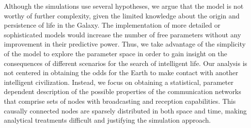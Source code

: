 \documentclass[crop]{CSLB}
\begin{document}
Although the simulations use several hypotheses, we
argue that the model is not worthy of further complexity,
given the limited knowledge about the origin and persistence of
life in the Galaxy.
%
The implementation of more detailed or sophisticated models
would increase the number of free parameters without any 
improvement in their predictive power.
%
Thus, we take advantage of the simplicity of the model to explore
the parameter space in order to gain insight on the consequences of
different scenarios for the search of intelligent life.
%
Our analysis is not centered in obtaining the odds for the Earth
to make contact with another intelligent civilization.
%
Instead, we focus on obtaining a statistical, parameter dependent
description of the possible properties of the communication networks
that comprise sets of nodes with broadcasting and reception
capabilities.
%
This causally connected nodes are sparsely distributed in both space
and time, making analytical treatments difficult and justifying
the simulation approach.
\end{document}
